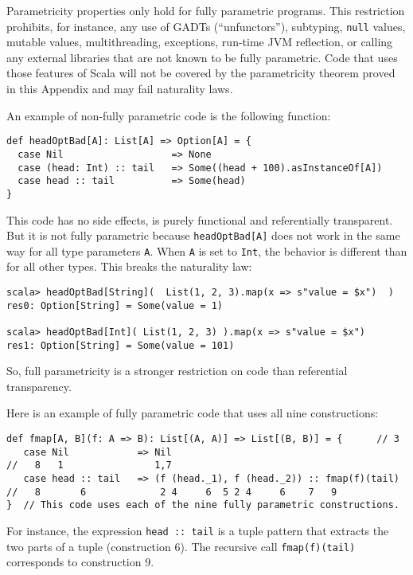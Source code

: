 Parametricity properties only hold for fully parametric programs.
This restriction prohibits, for instance, any use of GADTs
(\textsf{``}unfunctors\textsf{''}), subtyping,
\lstinline!null! values, mutable values, multithreading, exceptions,
run-time JVM reflection, or calling any external libraries that are
not known to be fully parametric. Code that uses those features of
Scala will not be covered by the parametricity theorem proved in this
Appendix and may fail naturality laws. 

An example of non-fully parametric code is the following function:
\begin{lstlisting}
def headOptBad[A]: List[A] => Option[A] = {
  case Nil                   => None
  case (head: Int) :: tail   => Some((head + 100).asInstanceOf[A])
  case head :: tail          => Some(head)
}
\end{lstlisting}
This code has no side effects, is purely functional and referentially
transparent. But it is not fully parametric because \lstinline!headOptBad[A]!
does not work in the same way for all type parameters \lstinline!A!.
When \lstinline!A! is set to \lstinline!Int!, the behavior is different
than for all other types. This breaks the naturality law:
\begin{lstlisting}
scala> headOptBad[String](  List(1, 2, 3).map(x => s"value = $x")  )
res0: Option[String] = Some(value = 1)

scala> headOptBad[Int]( List(1, 2, 3) ).map(x => s"value = $x")
res1: Option[String] = Some(value = 101)
\end{lstlisting}
So, full parametricity is a stronger restriction on code than referential
transparency.

Here is an example of fully parametric code that uses all nine constructions:
\begin{lstlisting}
def fmap[A, B](f: A => B): List[(A, A)] => List[(B, B)] = {      // 3
   case Nil            => Nil
//   8   1                1,7 
   case head :: tail   => (f (head._1), f (head._2)) :: fmap(f)(tail)
//   8       6             2 4     6  5 2 4     6    7   9
}  // This code uses each of the nine fully parametric constructions.
\end{lstlisting}
For instance, the expression \lstinline!head :: tail! is a tuple
pattern that extracts the two parts of a tuple (construction 6). The
recursive call \lstinline!fmap(f)(tail)! corresponds to construction
9.

